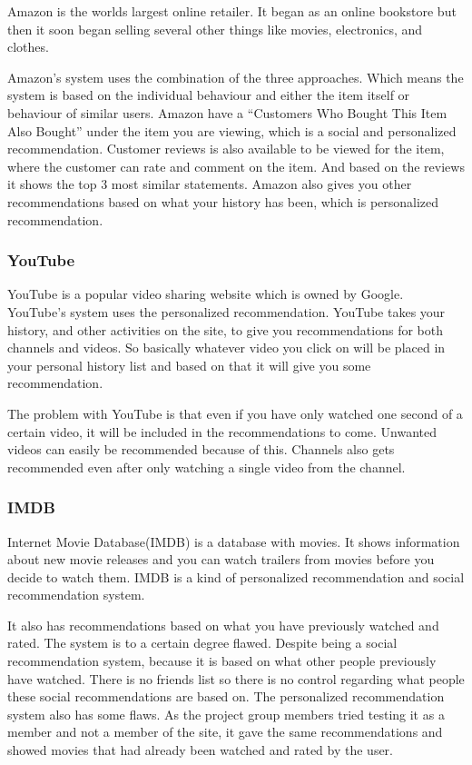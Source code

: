 Amazon is the worlds largest online retailer. It began as an online bookstore but then it soon began selling several other things like movies, electronics, and clothes.

Amazon's system uses the combination of the three approaches. Which means the system is based on the individual behaviour and either the item itself or behaviour of similar users. Amazon have a “Customers Who Bought This Item Also Bought” under the item you are viewing, which is a social and personalized recommendation. Customer reviews is also available to be viewed for the item, where the customer can rate and comment on the item. And based on the reviews it shows the top 3 most similar statements. Amazon also gives you other recommendations based on what your history has been, which is personalized recommendation.

\subsubsection{YouTube}

YouTube is a popular video sharing website which is owned by Google. YouTube's system uses the personalized recommendation. YouTube takes your history, and other activities on the site, to give you recommendations for both channels and videos. So basically whatever video you click on will be placed in your personal history list and based on that it will give you some recommendation.

The problem with YouTube is that even if you have only watched one second of a certain video, it will be included in the recommendations to come. Unwanted videos can easily be recommended because of this. Channels also gets recommended even after only watching a single video from the channel.

\subsubsection{IMDB}

Internet Movie Database(IMDB) is a database with movies. It shows information about new movie releases and you can watch trailers from movies before you decide to watch them. IMDB is a kind of  personalized recommendation and social recommendation system. 

It also has recommendations based on what you have previously watched and rated. The system is to a certain degree flawed. Despite being a social recommendation system, because it is based on what other people previously have watched. There is no friends list so there is no control regarding what people these social recommendations are based on. The personalized recommendation system also has some flaws. As the project group members tried testing it as a member and not a member of the site, it gave the same recommendations and showed movies that had already been watched and rated by the user.

